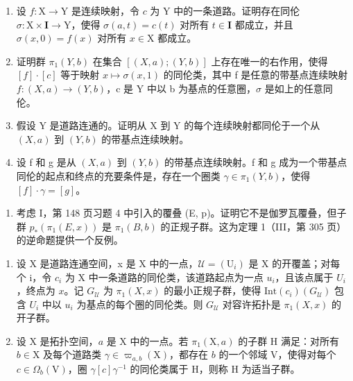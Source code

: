 \begin{enumerate}
\def\labelenumi{\alph{enumi})}
\item
  设 \(f \colon \mathrm{X} \to \mathrm{Y}\) 是连续映射，令 \(c\) 为 Y 中的一条道路。证明存在同伦 \(\sigma \colon \mathrm{X} \times \mathbf{I} \to \mathrm{Y}\)，使得 \(\sigma(a, t) = c(t)\) 对所有 \(t \in \mathbf{I}\) 都成立，并且 \(\sigma(x, 0) = f(x)\) 对所有 \(x \in \mathrm{X}\) 都成立。
\item
  证明群 \(\pi_{1}(Y,b)\) 在集合 \([(X,a);(Y,b)]\) 上存在唯一的右作用，使得 \([f]\cdot[c]\) 等于映射 \(x\mapsto\sigma(x,1)\) 的同伦类，其中 f 是任意的带基点连续映射 \(f\colon(X,a)\to(Y,b)\)，c 是 Y 中以 b 为基点的任意圈，\(\sigma\) 是如上的任意同伦。
\item
  假设 Y 是道路连通的。证明从 X 到 Y 的每个连续映射都同伦于一个从 \((X, a)\) 到 \((Y, b)\) 的带基点连续映射。
\item
  设 f 和 g 是从 \((X, a)\) 到 \((Y, b)\) 的带基点连续映射。f 和 g 成为一个带基点同伦的起点和终点的充要条件是，存在一个圈类 \(\gamma \in \pi_{1}(Y, b)\)，使得 \([f] \cdot \gamma = [g]\)。
\end{enumerate}

\exercisegroup

\begin{enumerate}
\def\labelenumi{\arabic{enumi})}
\tightlist
\item
  考虑 I，第 148 页习题 4 中引入的覆叠 (E, p)。证明它不是伽罗瓦覆叠，但子群 \(p_{*}(\pi_{1}(E, x))\) 是 \(\pi_{1}(B, b)\) 的正规子群。这为定理 1（III，第 305 页）的逆命题提供一个反例。
\end{enumerate}

\exercisegroup

\begin{enumerate}
\def\labelenumi{\arabic{enumi})}
\item
  设 X 是道路连通空间，x 是 X 中的一点，\(\mathcal{U} = (\mathrm{U}_{i})\) 是 X 的开覆盖；对每个 i，令 \(c_{i}\) 为 X 中一条道路的同伦类，该道路起点为一点 \(u_i\)，且该点属于 \(U_i\)，终点为 \(x\)。记 \(G_{\mathcal{U}}\) 为 \(\pi_1(X,x)\) 的最小正规子群，使得 \(\text{Int}(c_i)(G_{\mathcal{U}})\) 包含 \(U_i\) 中以 \(u_i\) 为基点的每个圈的同伦类。则 \(G_{\mathcal{U}}\) 对容许拓扑是 \(\pi_1(X,x)\) 的开子群。
\item
  设 X 是拓扑空间，\(a\) 是 X 中的一点。若 \(\pi_1(\mathrm{X}, a)\) 的子群 H 满足：对所有 \(b \in \mathrm{X}\) 及每个道路类 \(\gamma \in \varpi_{a,b}(\mathrm{X})\)，都存在 \(b\) 的一个邻域 V，使得对每个 \(c \in \Omega_b(\mathrm{V})\)，圈 \(\gamma[c]\gamma^{-1}\) 的同伦类属于 H，则称 H 为适当子群。
\end{enumerate}

